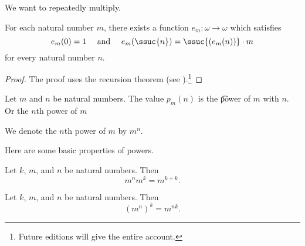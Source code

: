 

We want to repeatedly multiply.


\begin{proposition}
	For each natural number $m$, there exists a function $e_m: \omega \to \omega$ which satisfies
	\[
		e_m(0) = 1 \quad \text{ and } \quad e_m(\ssuc{n}) = \ssuc{(e_m(n))} \cdot m
	\]
	for every natural number $n$.
\end{proposition}
\begin{proof}
	The proof uses the recursion theorem (see ).\footnote{Future editions will give the entire account.}
\end{proof}
Let $m$ and $n$ be natural numbers.
The value $p_m(n)$ is the \t{power} of $m$ with $n$.
Or the \t{$n$th power of $m$}


We denote the $n$th power of $m$ by $m^n$.


Here are some basic properties of powers.

\begin{proposition}
	Let $k$, $m$, and $n$ be natural numbers. Then
	\[
		m^{n}m^{k} = m^{k + k}.
	\]
\end{proposition}

\begin{proposition}
	Let $k$, $m$, and $n$ be natural numbers. Then
	\[
		(m^{n})^k = m^{nk}.
	\]
\end{proposition}